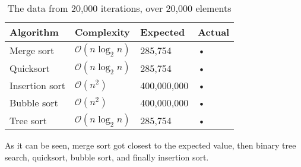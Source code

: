 \documentclass[12pt, a4paper]{article}
\begin{document}
\begin{table}[ht!]
\begin{tabular}{|p{3cm}|p{3cm}|p{3cm}|p{3cm}|}
\hline 
Algorithm & Complexity & Expected & Actual \\ 
\hline 
Merge sort & $\mathcal{O}(n \log_2 n)$ & 285,754 & • \\ 
\hline 
Quicksort & $\mathcal{O}(n \log_2 n)$ & 285,754 & • \\ 
\hline 
Insertion sort & $\mathcal{O}(n^2)$ & 400,000,000 & • \\ 
\hline 
Bubble sort & $\mathcal{O}(n^2)$ & 400,000,000 & • \\ 
\hline 
Tree sort & $\mathcal{O}(n \log_2 n)$ & 285,754 & • \\ 
\hline 
\end{tabular} 
\caption{The data from 20,000 iterations, over 20,000 elements}
\label{table:experimentalData2}
\end{table}

As it can be seen, merge sort got closest to the expected value, then binary tree search, quicksort, bubble sort, and finally insertion sort.
\end{document}

